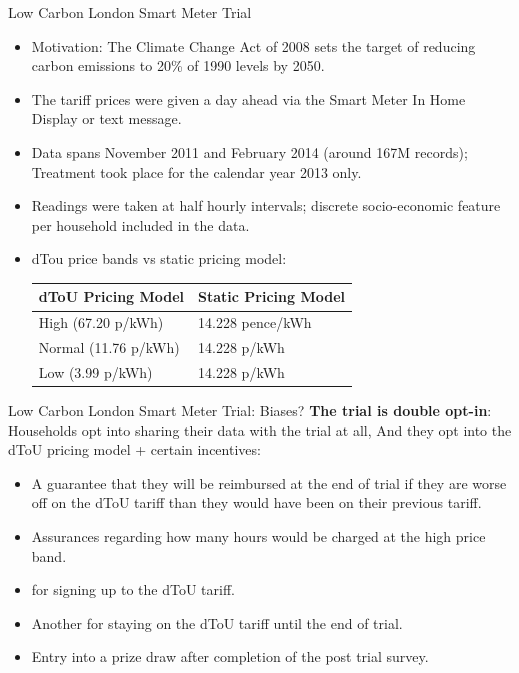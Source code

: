 \documentclass{beamer}
\begin{document}
\begin{frame}{Low Carbon London Smart Meter Trial}
  \begin{itemize}
    \item<+-> Motivation: The Climate Change Act of 2008 sets the target of reducing carbon emissions to 20\% of 1990 levels by 2050.
    \item<+-> The tariff prices were given a day ahead via the Smart Meter In Home Display or text message.
    \item<+-> Data spans November 2011 and February 2014 (around 167M records); Treatment took place for the calendar year 2013 only.
    \item<+-> Readings were taken at half hourly intervals; discrete socio-economic feature per household included in the data.
    \item<+-> dTou price bands vs static pricing model:
    \begin{table}[]
      \begin{tabular}{|l|l|}
        \hline
        dToU Pricing Model & Static Pricing Model \\ \hline
        High (67.20 p/kWh) & 14.228 pence/kWh \\ \hline
        Normal (11.76 p/kWh) & 14.228 p/kWh \\ \hline
        Low (3.99 p/kWh) & 14.228 p/kWh \\ \hline
      \end{tabular}
    \end{table}
  \end{itemize}
\end{frame}

\begin{frame}{Low Carbon London Smart Meter Trial: Biases?}
  \textbf{The trial is double opt-in}: Households opt into sharing their data with the trial at all, And they opt into the dToU pricing model + certain incentives:
  \begin{itemize}
    \item A guarantee that they will be reimbursed at the end of trial if they are worse off on the dToU tariff than they would have been on their previous tariff.
    \item Assurances regarding how many hours would be charged at the high price band.
    \item {} for signing up to the dToU tariff.
    \item Another  for staying on the dToU tariff until the end of trial.
    \item Entry into a prize draw after completion of the post trial survey.
  \end{itemize}
\end{frame}
\end{document}
